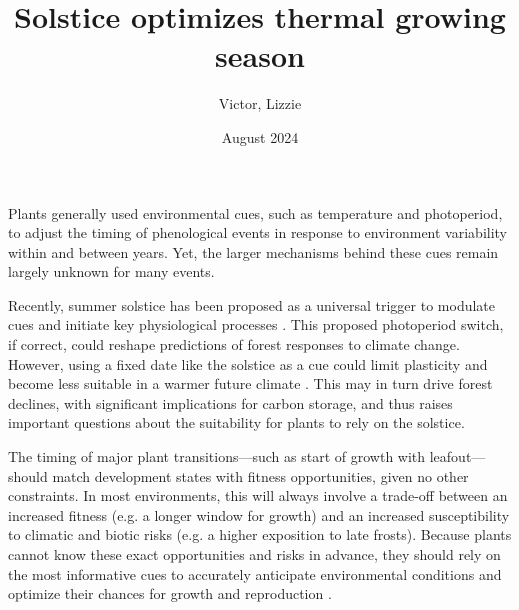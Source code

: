 \documentclass[11pt,letter]{article}
\title{Solstice optimizes thermal growing season}
\author{Victor, Lizzie}
\date{August 2024}
\begin{document}
\maketitle


Plants generally used environmental cues, such as temperature and photoperiod, to adjust the timing of phenological events in response to environment variability within and between years. Yet, the larger mechanisms behind these cues remain largely unknown for many events. 

Recently, summer solstice has been proposed as a universal trigger to modulate cues and initiate key physiological processes \cite{Zohner2023, Journe2024}. This proposed photoperiod switch, if correct, could reshape predictions of forest responses to climate change. However, using a fixed date like the solstice as a cue could limit plasticity and become less suitable in a warmer future climate \cite{Wolkovich2021}. This may in turn drive forest declines, with significant implications for carbon storage, and thus raises important questions about the suitability for plants to rely on the solstice. 

The timing of major plant transitions---such as start of growth with leafout---should match development states with fitness opportunities, given no other constraints. In most environments, this will always involve a trade-off between an increased fitness (e.g. a longer window for growth) and an increased susceptibility to climatic and biotic risks (e.g. a higher exposition to late frosts). Because plants cannot know these exact opportunities and risks in advance, they should rely on the most informative cues to accurately anticipate environmental conditions and optimize their chances for growth and reproduction \cite{Chevin2015, Bonamour2019}.
\end{document}
